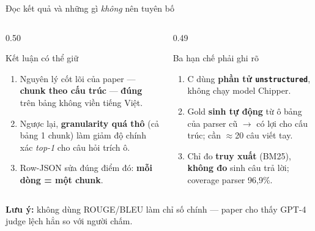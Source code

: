 \documentclass[aspectratio=169,11pt]{beamer}
\begin{document}
\begin{frame}{Đọc kết quả và những gì \emph{không} nên tuyên bố}
  \begin{columns}[T]
    \begin{column}{0.50\textwidth}
      \begin{block}{\small Kết luận có thể giữ}
        \begin{enumerate}\small
          \item Nguyên lý cốt lõi của paper — \textbf{chunk theo cấu trúc} —
            \textbf{đúng} trên bảng không viền tiếng Việt.
          \item Ngược lại, \textbf{granularity quá thô} (cả bảng 1 chunk) làm giảm
            độ chính xác \emph{top-1} cho câu hỏi trích ô.
          \item Row-JSON sửa đúng điểm đó: \textbf{mỗi dòng = một chunk}.
        \end{enumerate}
      \end{block}
    \end{column}
    \begin{column}{0.49\textwidth}
      \begin{alertblock}{\small Ba hạn chế phải ghi rõ}
        \begin{enumerate}\small
          \item C dùng \textbf{phần tử \texttt{unstructured}}, không chạy model Chipper.
          \item Gold \textbf{sinh tự động} từ ô bảng của parser cũ $\rightarrow$
            có lợi cho cấu trúc; cần $\approx$20 câu viết tay.
          \item Chỉ đo \textbf{truy xuất} (BM25), \textbf{không đo} sinh câu trả
            lời; coverage parser 96,9\%.
        \end{enumerate}
      \end{alertblock}
    \end{column}
  \end{columns}
  \vspace{0.1em}
  {\footnotesize \textbf{Lưu ý:} không dùng ROUGE/BLEU làm chỉ số chính — paper
  cho thấy GPT-4 judge lệch hẳn so với người chấm.}
\end{frame}
\end{document}
